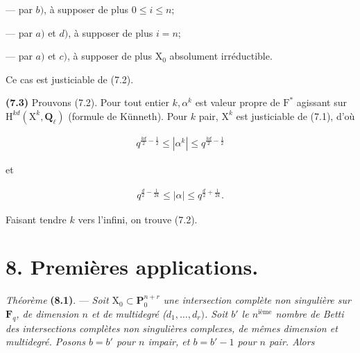 \documentclass[10pt,leqno]{article}
\begin{document}
\noindent — par \(b)\), à supposer de plus \(0\leq i\leq n\);\par

\noindent — par \(a)\) et \(d)\), à supposer de plus \(i=n\);\par

\noindent — par \(a)\) et \(c)\), à supposer de plus \(\mathrm{X}_{0}\) absolument irréductible.\par

\noindent Ce cas est justiciable de (7.2).\par

\noindent \textbf{(7.3)} Prouvons (7.2). Pour tout entier \(k, \alpha ^{k}\) est valeur propre de \(\mathrm{F}^{*}\) agissant sur \(\mathrm{H}^{kd}(\mathrm{X}^{k},\mathbf{Q}_{\ell })\) (formule de Künneth). Pour \(k\) pair, \(\mathrm{X}^{k}\) est justiciable de (7.1), d’où\par

\begin{equation*}\begin{gathered}q^{\frac{kd}{2}- \frac{1}{2}} \leq  |\alpha ^{k}| \leq  q^{\frac{kd}{2}- \frac{1}{2}}\end{gathered}\end{equation*}

\noindent et\par

\begin{equation*}\begin{gathered}q^{\frac{d}{2}- \frac{1}{2k}} \leq  |\alpha | \leq  q^{\frac{d}{2}+\frac{1}{2k}}.\end{gathered}\end{equation*}

\noindent Faisant tendre \(k\) vers l’infini, on trouve (7.2).\par

\section*{8. Premières applications.}

\noindent \emph{Théorème} \textbf{(8.1)}. — {\itshape Soit \(\mathrm{X}_{0}\subset \mathbf{P}_{0}^{n+r}\) une intersection complète non singulière sur \(\mathbf{F}_{q}\), de dimension \(n\) et de multidegré (\(d_{1},\ldots ,d_{r})\). Soit \(b'\) le \(n^{\mathrm{ième}}\) nombre de Betti des intersections complètes non singulières complexes, de mêmes dimension et multidegré. Posons \(b=b'\) pour \(n\) impair, et \(b=b'- 1\) pour \(n\) pair. Alors}\par
\end{document}
